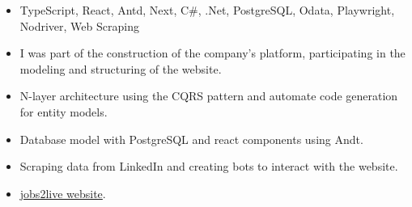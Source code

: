 \documentclass[10pt,a4paper]{altacv}
\begin{document}





\begin{fullwidth}
	\makecvheader
\end{fullwidth}




\begin{itemize}
	\item TypeScript, React, Antd, Next, C\#, .Net, PostgreSQL, Odata, Playwright, Nodriver, Web Scraping
	\item I was part of the construction of the company's platform, participating in the modeling and structuring of the website.
	\item N-layer architecture using the CQRS pattern and automate code generation for entity models.
	\item Database model with PostgreSQL and react components using Andt.
	\item Scraping data from LinkedIn and creating bots to interact with the website.
	\item \href{https://www.jobs2live.com/website}{jobs2live website}.

\end{itemize}
\end{document}

